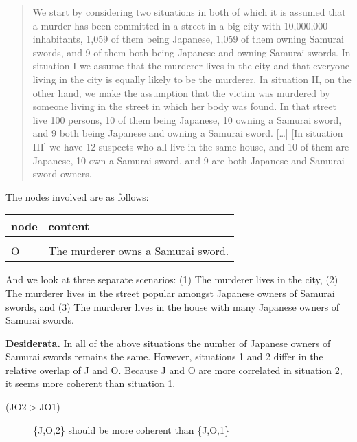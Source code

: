 \documentclass[10pt,]{scrartcl}
\newcommand{\s}[1]{\mbox{\textsf{#1}}}
\begin{document}
\begin{quote}
  We start by considering two situations in both of which it is assumed that a murder has been committed in a street in a big city with 10,000,000 inhabitants, 1,059 of them being Japanese, 1,059 of them owning Samurai swords, and 9 of them both being Japanese and owning Samurai swords. In situation I we assume that the murderer lives in the city and that everyone living in the city is equally likely to be the murderer. In situation II, on the other hand, we make the assumption that the victim was murdered by someone living in the street in which her body was found. In that street live 100 persons, 10 of them being Japanese, 10 owning a Samurai sword, and 9 both being Japanese and owning a Samurai sword. [\dots] [In situation III] we have 12 suspects who all live in the same house, and 10 of them are Japanese, 10 own a Samurai sword, and 9 are both Japanese and Samurai sword owners.
\end{quote}

The nodes involved are as follows:

\begin{table}[H]
\centering
\begin{tabular}{ll}
\toprule
node & content\\
\midrule
\cellcolor{gray!6}{J} & \cellcolor{gray!6}{The murderer is Japanese.}\\
O & The murderer owns a Samurai sword.\\
\bottomrule
\end{tabular}
\end{table}

And we look at three separate scenarios: (\textsf{1}) The murderer lives
in the city, (\textsf{2}) The murderer lives in the street popular
amongst Japanese owners of Samurai swords, and (\textsf{3}) The murderer
lives in the house with many Japanese owners of Samurai swords.

\noindent \textbf{Desiderata.} In all of the above situations the number
of Japanese owners of Samurai swords remains the same. However,
situations 1 and 2 differ in the relative overlap of \s{J} and \s{O}.
Because \s{J} and \s{O} are more correlated in situation 2, it seems
more coherent than situation 1.

\vspace{2mm}

\begin{description}
    \item[(\s{JO2}$>$\s{JO1})]  \{\s{J,O,2}\} should be more coherent than \{\s{J,O,1}\}
\end{description}
\end{document}
